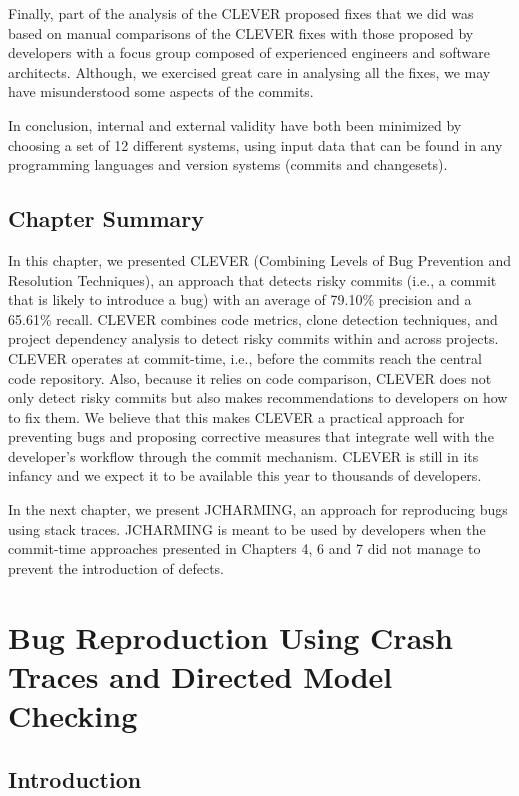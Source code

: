 \documentclass[12pt]{report}
\begin{document}
Finally, part of the analysis of the CLEVER proposed fixes that we did
was based on manual comparisons of the CLEVER fixes with those proposed
by developers with a focus group composed of experienced engineers and
software architects. Although, we exercised great care in analysing all
the fixes, we may have misunderstood some aspects of the commits.

In conclusion, internal and external validity have both been minimized
by choosing a set of 12 different systems, using input data that can be
found in any programming languages and version systems (commits and
changesets).

\section{Chapter Summary}\label{chapter-summary-3}

In this chapter, we presented CLEVER (Combining Levels of Bug Prevention
and Resolution Techniques), an approach that detects risky commits
(i.e., a commit that is likely to introduce a bug) with an average of
79.10\% precision and a 65.61\% recall. CLEVER combines code metrics,
clone detection techniques, and project dependency analysis to detect
risky commits within and across projects. CLEVER operates at
commit-time, i.e., before the commits reach the central code repository.
Also, because it relies on code comparison, CLEVER does not only detect
risky commits but also makes recommendations to developers on how to fix
them. We believe that this makes CLEVER a practical approach for
preventing bugs and proposing corrective measures that integrate well
with the developer's workflow through the commit mechanism. CLEVER is
still in its infancy and we expect it to be available this year to
thousands of developers.

In the next chapter, we present JCHARMING, an approach for reproducing
bugs using stack traces. JCHARMING is meant to be used by developers
when the commit-time approaches presented in Chapters 4, 6 and 7 did not
manage to prevent the introduction of defects.

\chapter{Bug Reproduction Using Crash Traces and Directed Model
Checking}\label{bug-reproduction-using-crash-traces-and-directed-model-checking}

\section{Introduction}\label{introduction-5}
\end{document}
